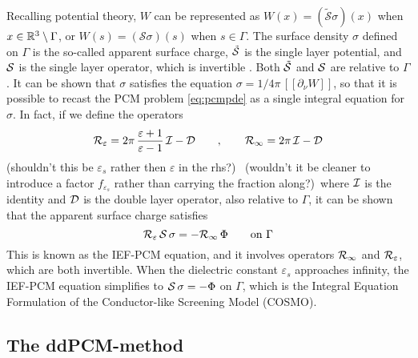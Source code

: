 Recalling potential theory, $W$ can be represented as $W(x) = (\tilde{\mathcal{S}}\sigma)(x)$ when $x \in \mathbb{R}^3 \setminus \Gamma$, or $W(s) = (\mathcal{S}\sigma)(s)$ when $s \in \Gamma$. 
The surface density $\sigma$ defined on $\Gamma$ is the so-called apparent surface charge,  $\tilde{\mathcal{S}}$ is the single layer potential, and $\mathcal{S}$ is the single layer operator,  which is invertible \cite{Calderon}. Both $\tilde{\mathcal{S}}$ and $\mathcal{S}$ are relative to $\Gamma$.
It can be shown that $\sigma$ satisfies the equation $\sigma = 1/4\pi \, [\![ \partial_\nu W]\!]$, so that it is possible to recast the PCM problem \eqref{eq:pcmpde} as a single integral equation for $\sigma$. In fact, if we define the operators 
\begin{equation}
 \label{eq:Reps}
 \mathcal{R}_\varepsilon = 2\pi \, \frac{\varepsilon+1}{\varepsilon-1} \, \mathcal{I} - \mathcal{D} \qquad, \qquad \mathcal{R}_\infty = 2\pi \, \mathcal{I} - \mathcal{D}
\end{equation}
{\color{red} (shouldn't this be $\varepsilon_s$ rather then $\varepsilon$ in the rhs?)~}{\color{red} (wouldn't it be cleaner to introduce a factor $f_{\varepsilon_s}$ rather than carrying the fraction along?)~}where $\mathcal{I}$ is the identity and $\mathcal{D}$ is the double layer operator, also relative to $\Gamma$, it can be shown\cite{ReviewPCM_2005} that the apparent surface charge satisfies
\begin{equation}
\label{eq:IEFPCM}
\mathcal{R}_\varepsilon \, \mathcal{S} \, \sigma = - \mathcal{R}_\infty \, \Phi \qquad \text{on }\Gamma
\end{equation}
This is known as the IEF-PCM equation, and it involves operators $\mathcal{R}_\infty$ and $\mathcal{R}_\varepsilon$, which are both invertible. When the dielectric constant $\varepsilon_s$ approaches infinity, the IEF-PCM equation simplifies to $\mathcal{S} \, \sigma = - \Phi$ on $\Gamma$, which is the Integral Equation Formulation of the Conductor-like Screening Model (COSMO)\cite{Lipparini_JCP_VPCM}.


\subsection{The ddPCM-method}



